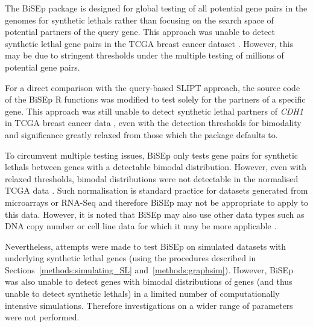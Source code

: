 The \gls{BiSEp} package is designed for global testing of all potential gene pairs in the \glspl{genome} for \glspl{synthetic lethal} rather than focusing on the search space of  potential partners of the query gene. This approach was unable to detect \gls{synthetic lethal} gene pairs in the \gls{TCGA} breast cancer  dataset \citep{TCGA2012}. However, this may be due to stringent thresholds under the multiple testing of millions of potential gene pairs.

For a direct comparison with the query-based \gls{SLIPT} approach, the source code of the \gls{BiSEp} R functions was modified to test solely for the partners of a specific gene. This approach was still unable to detect \gls{synthetic lethal} partners of \textit{CDH1} in \gls{TCGA} breast cancer  data \citep{TCGA2012}, even with the detection thresholds for bimodality and significance greatly relaxed from those which the package defaults to.

To circumvent multiple testing issues, \gls{BiSEp} only tests gene pairs for \glspl{synthetic lethal} between genes with a detectable bimodal distribution. However, even with relaxed thresholds, bimodal distributions were not detectable in the normalised \gls{TCGA} data \citep{TCGA2012}. Such normalisation \cite{limma} is standard practice for  datasets generated from \glspl{microarray} or \gls{RNA-Seq} and therefore \gls{BiSEp} may not be appropriate to apply to this data. However, it is noted that \gls{BiSEp} may also use other data types such as \acrshort{DNA} copy number or cell line data for which it may be more applicable \citep{Wappett2016}.

Nevertheless, attempts were made to test \gls{BiSEp} on simulated datasets with underlying \gls{synthetic lethal} genes (using the procedures described in Sections~\ref{methods:simulating_SL} and~\ref{methods:graphsim}). However, \gls{BiSEp} was also unable to detect genes with bimodal distributions of genes (and thus unable to detect \glspl{synthetic lethal}) in a limited number of computationally intensive simulations. Therefore investigations on a wider range of parameters were not performed.


\iffalse


